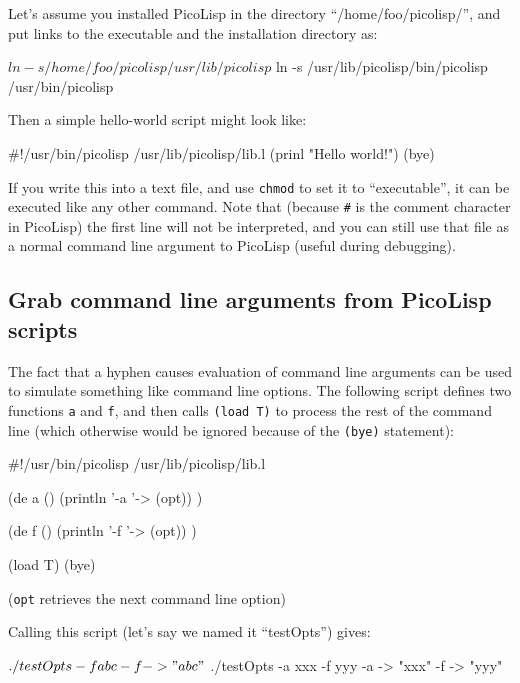 Let's assume you installed PicoLisp in the directory
``/home/foo/picolisp/'', and put links to the executable and the
installation directory as:


\begin{wideverbatim}
$ ln -s /home/foo/picolisp /usr/lib/picolisp
$ ln -s /usr/lib/picolisp/bin/picolisp /usr/bin/picolisp
\end{wideverbatim}

Then a simple hello-world script might look like:


\begin{wideverbatim}
#!/usr/bin/picolisp /usr/lib/picolisp/lib.l
(prinl "Hello world!")
(bye)
\end{wideverbatim}

If you write this into a text file, and use \texttt{chmod} to set it to
``executable'', it can be executed like any other command. Note that
(because \texttt{\#} is the comment character in PicoLisp) the first line will
not be interpreted, and you can still use that file as a normal command
line argument to PicoLisp (useful during debugging).

 
\subsection{Grab command line arguments from PicoLisp scripts}
\label{sec:tut-grab-command-line-arguments-from-picolisp-scripts}


The fact that a hyphen causes evaluation of command line arguments can
be used to simulate something like command line options. The following
script defines two functions \texttt{a} and \texttt{f}, and then calls \texttt{(load T)} to
process the rest of the command line (which otherwise would be ignored
because of the \texttt{(bye)} statement):


\begin{wideverbatim}
#!/usr/bin/picolisp /usr/lib/picolisp/lib.l

(de a ()
   (println '-a '-> (opt)) )

(de f ()
   (println '-f '-> (opt)) )

(load T)
(bye)
\end{wideverbatim}

(\texttt{opt} retrieves the next command line option)

Calling this script (let's say we named it ``testOpts'') gives:


\begin{wideverbatim}
$ ./testOpts -f abc
-f -> "abc"
$ ./testOpts -a xxx  -f yyy
-a -> "xxx"
-f -> "yyy"
\end{wideverbatim}

